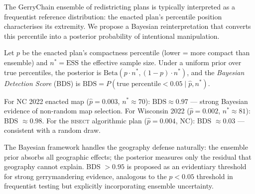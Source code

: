 The GerryChain ensemble of redistricting plans is typically interpreted as a frequentist
reference distribution: the enacted plan's percentile position characterises its extremity.
We propose a Bayesian reinterpretation that converts this percentile into a posterior
probability of intentional manipulation.

Let $p$ be the enacted plan's compactness percentile (lower = more compact than ensemble)
and $n^* = \mathrm{ESS}$ the effective sample size.
Under a uniform prior over true percentiles, the posterior is
$\mathrm{Beta}(p \cdot n^*, (1-p)\cdot n^*)$,
and the \emph{Bayesian Detection Score} (BDS) is
$\mathrm{BDS} = P(\text{true percentile} < 0.05 \mid \hat{p}, n^*)$.

For NC 2022 enacted map ($\hat{p} = 0.003$, $n^* \approx 70$):
$\mathrm{BDS} \approx 0.97$ --- strong Bayesian evidence of non-random map selection.
For Wisconsin 2022 ($\hat{p} = 0.002$, $n^* \approx 81$): BDS $\approx 0.98$.
For the \textsc{bisect} algorithmic plan ($\hat{p} = 0.004$, NC): BDS $\approx 0.03$ ---
consistent with a random draw.

The Bayesian framework handles the geography defense naturally: the ensemble prior
absorbs all geographic effects; the posterior measures only the residual that geography
cannot explain.
BDS $> 0.95$ is proposed as an evidentiary threshold for strong gerrymandering evidence,
analogous to the $p < 0.05$ threshold in frequentist testing but explicitly incorporating
ensemble uncertainty.
